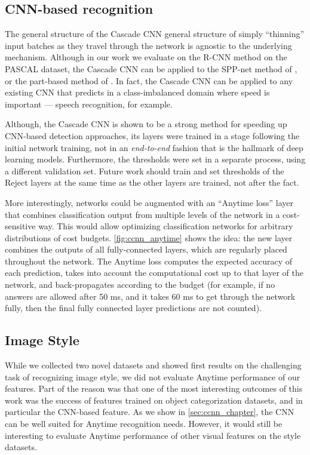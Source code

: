 \subsection{CNN-based recognition}

The general structure of the Cascade CNN general structure of simply ``thinning'' input batches as they travel through the network is agnostic to the underlying mechanism.
Although in our work we evaluate on the R-CNN method on the PASCAL dataset, the Cascade CNN can be applied to the SPP-net method of \cite{He-ECCV-2014}, or the part-based method of \cite{Zhang-ECCV-2014}.
In fact, the Cascade CNN can be applied to any existing CNN that predicts in a class-imbalanced domain where speed is important --- speech recognition, for example.

Although, the Cascade CNN is shown to be a strong method for speeding up CNN-based detection approaches, its layers were trained in a stage following the initial network training, not in an \emph{end-to-end} fashion that is the hallmark of deep learning models.
Furthermore, the thresholds were set in a separate process, using a different validation set.
Future work should train and set thresholds of the Reject layers at the same time as the other layers are trained, not after the fact.



More interestingly, networks could be augmented with an ``Anytime loss'' layer that combines classification output from multiple levels of the network in a cost-sensitive way.
This would allow optimizing classification networks for arbitrary distributions of cost budgets.
\autoref{fig:ccnn_anytime} shows the idea: the new layer combines the outputs of all fully-connected layers, which are regularly placed throughout the network.
The Anytime loss computes the expected accuracy of each prediction, takes into account the computational cost up to that layer of the network, and back-propagates according to the budget (for example, if no answers are allowed after 50 ms, and it takes 60 ms to get through the network fully, then the final fully connected layer predictions are not counted).

\subsection{Image Style}
While we collected two novel datasets and showed first results on the challenging task of recognizing image style, we did not evaluate Anytime performance of our features.
Part of the reason was that one of the most interesting outcomes of this work was the success of features trained on object categorization datasets, and in particular the CNN-based feature.
As we show in \autoref{sec:ccnn_chapter}, the CNN can be well suited for Anytime recognition needs.
However, it would still be interesting to evaluate Anytime performance of other visual features on the style datasets.

